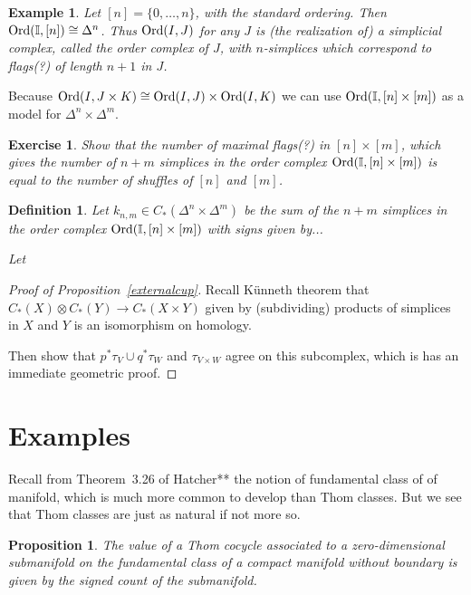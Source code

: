 \documentclass{amsart}          %
\newtheorem{proposition}[theorem]{Proposition}
\newtheorem{definition}[theorem]{Definition}
\newtheorem{example}[theorem]{Example}
\newtheorem{exercise}[theorem]{Exercise}
\newcommand{\I}{\mathbb I}
\begin{document}
\begin{example}
Let $[n] = \{0, \ldots, n\}$, with the standard ordering.  Then ${\rm Ord}(\I, [n]) \cong \Delta^n$.  Thus  ${\rm Ord}(I,J)$ for any $J$
is (the realization of) a simplicial complex, called the order complex of $J$, with $n$-simplices which correspond to flags(?)
of length $n + 1$ in $J$.
\end{example}

Because ${\rm Ord}(I,J \times K) \cong {\rm Ord}(I,J) \times {\rm Ord}(I,K)$ we can use ${\rm Ord}(\I,[n] \times [m])$
as a model for $\Delta^n \times \Delta^m$.   

\begin{exercise}
Show that the number of maximal flags(?) in $[n] \times [m]$, which gives the number of
$n + m$ simplices in the order complex ${\rm Ord}(\I, [n] \times [m])$ is equal to the number of shuffles of $[n]$ and $[m]$.
\end{exercise}

\begin{definition}
Let $k_{n,m} \in C_*(\Delta^n \times \Delta^m)$ be the sum of the $n + m$ simplices in the order complex ${\rm Ord}(\I, [n] \times [m])$
with signs given by...  

Let 
\end{definition}


\begin{proof}[Proof of Proposition~\ref{externalcup}]
Recall K\"unneth theorem that  $C_*(X) \otimes C_*(Y) \to C_*(X \times Y)$ given by (subdividing) products of simplices in $X$ and $Y$ is an
isomorphism on homology.  

Then show that $p^* \tau_V \cup q^* \tau_W$ and $\tau_{V \times W}$ agree on this subcomplex, which is has an immediate
geometric proof.
\end{proof}

\section{Examples}

Recall from Theorem~3.26 of Hatcher** the notion of fundamental class of of manifold, which  is much more common to 
develop than Thom classes.  
But we see that Thom classes are just as natural if not more so.


\begin{proposition}\label{top_cohomology}
The value of a Thom cocycle associated to a zero-dimensional submanifold on the fundamental class of a compact manifold without
boundary  is given by 
the signed count of the submanifold.
\end{proposition}
\end{document}
